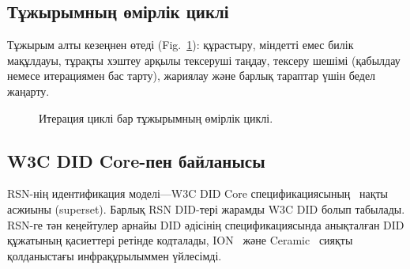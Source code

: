 \documentclass[11pt,a4paper,twocolumn]{article}
\begin{document}
\subsection{Тұжырымның өмірлік циклі}

Тұжырым алты кезеңнен өтеді (Fig.~\ref{fig:lifecycle}): құрастыру, міндетті емес билік мақұлдауы, тұрақты хэштеу арқылы тексеруші таңдау, тексеру шешімі (қабылдау немесе итерациямен бас тарту), жариялау және барлық тараптар үшін бедел жаңарту.

\begin{figure}[ht]
\centering
{}
\caption{Итерация циклі бар тұжырымның өмірлік циклі.}
\label{fig:lifecycle}
\end{figure}

\subsection{W3C DID Core-пен байланысы}

RSN-нің идентификация моделі---W3C DID Core спецификациясының~\cite{did2022} нақты асжиыны (superset). Барлық RSN DID-тері жарамды W3C DID болып табылады. RSN-ге тән кеңейтулер арнайы DID әдісінің спецификациясында анықталған DID құжатының қасиеттері ретінде кодталады, ION~\cite{buchner2021} және Ceramic~\cite{ceramic2023} сияқты қолданыстағы инфрақұрылыммен үйлесімді.

\end{document}
